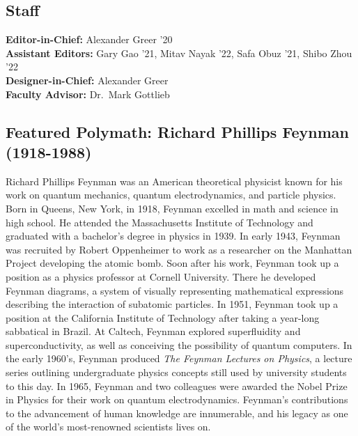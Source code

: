 \documentclass[12pt]{article}
\begin{document}
\subsection*{Staff}
{\centering{}
    \textbf{Editor-in-Chief:} Alexander Greer '20
    \\
    \textbf{Assistant Editors:} Gary Gao '21, Mitav Nayak '22, Safa Obuz '21, Shibo Zhou '22
    \\
    \textbf{Designer-in-Chief:} Alexander Greer
    \\
    \textbf{Faculty Advisor:} Dr.\ Mark Gottlieb
    \\}
\subsection*{Featured Polymath: Richard Phillips Feynman (1918-1988)}
Richard Phillips Feynman was an American theoretical physicist known for his work on quantum mechanics, quantum electrodynamics, and particle physics. Born in Queens, New York, in 1918, Feynman excelled in math and science in high school. He attended the Massachusetts Institute of Technology and graduated with a bachelor’s degree in physics in 1939. In early 1943, Feynman was recruited by Robert Oppenheimer to work as a researcher on the Manhattan Project developing the atomic bomb. Soon after his work, Feynman took up a position as a physics professor at Cornell University. There he developed Feynman diagrams, a system of visually representing mathematical expressions describing the interaction of subatomic particles. In 1951, Feynman took up a position at the California Institute of Technology after taking a year-long sabbatical in Brazil. At Caltech, Feynman explored superfluidity and superconductivity, as well as conceiving the possibility of quantum computers. In the early 1960’s, Feynman produced \textit{The Feynman Lectures on Physics}, a lecture series outlining undergraduate physics concepts still used by university students to this day. In 1965, Feynman and two colleagues were awarded the Nobel Prize in Physics for their work on quantum electrodynamics. Feynman’s contributions to the advancement of human knowledge are innumerable, and his legacy as one of the world’s most-renowned scientists lives on. 
\newpage


\def\currentTitleWallpaper{2020_Pure_Math_Title_Page_Border.pdf}
\end{document}
